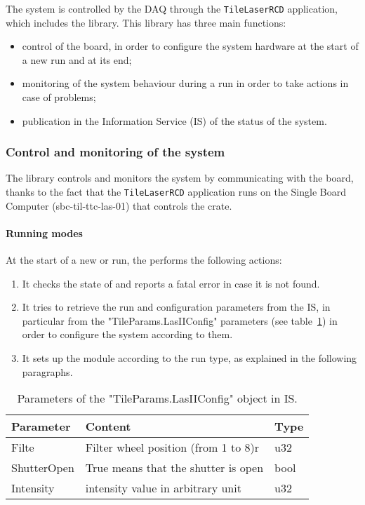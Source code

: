 

The \lasii{} system is controlled by the \atlas{} DAQ through the {\tt TileLaserRCD} application,
which includes the \lasmodule{} library. This library has three main functions:
\begin{itemize}
\item control of the \lascar{} \vme{} board, in order to configure the \lasii{} system
hardware at the start of a new run and at its end;
\item monitoring of the \lasii{} system behaviour during a run in order to take actions in
case of problems;
\item publication in the Information Service (IS) of the status of the \lasii{} system.
\end{itemize}

\subsubsection{Control and monitoring of the system}
The \lasmodule{} library controls and monitors the \lasii{} system by communicating with the
\lascar{} board, thanks to the fact that the {\tt TileLaserRCD} application runs on the
Single Board Computer (sbc-til-ttc-las-01) that controls the \lasii{} \vme{} crate.

\paragraph{Running modes}
At the start of a new \atlas{} or \tilecal{} run, the \lasmodule{} performs the following
actions:
\begin{enumerate}
\item It checks the state of \lascar{} and reports a fatal error in case it is not found.
\item It tries to retrieve the run and configuration parameters from the IS, in particular
from the "TileParams.LasIIConfig" parameters (see table~\ref{tab:IS:lasIIconfig}) in order to configure the \lasii{}
system according to them.
\item It sets up the \lascar{} module according to the run type, as explained
in the following paragraphs.
\end{enumerate}

\begin{table}[ht]
  \begin{center}
    \caption{Parameters of the "TileParams.LasIIConfig" object in IS.}\label{tab:IS:lasIIconfig}
    \begin{tabular}{lll}
      \hline\hline
      Parameter & Content & Type \\
      \hline
      Filte & Filter wheel position (from 1 to 8)r & u32 \\
      ShutterOpen & True means that the shutter is open & bool \\
      Intensity & \las{} intensity value in arbitrary unit & u32 \\
      \hline
    \end{tabular}
  \end{center}
\end{table}

